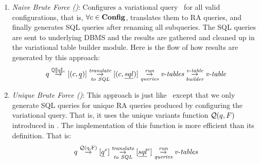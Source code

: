 \begin{enumerate}
\item
\emph{Naive Brute Force (\nbf)}:
Configures a variational query \vQ\ for all valid configurations, that is, 
\ensuremath{\forall \config \in \confSet}, translates them to RA queries,
and finally generates SQL queries after renaming all subqueries. The 
SQL queries are sent to underlying DBMS and the results are gathered and
cleaned up in the variational table builder module. Here is the flow of how results are generated by 
this approach:
%
\[\vQ \mathrel{\mathop{\rightarrow}^{\mathrm{\eeSem \vQ}}} [ ( \config, \pQ ) ] 
\mathrel{\mathop{\rightarrow}^{\mathrm{\textit{translate}}}_{\mathrm{\textit{to SQL}}}} [ ( \config, \sqlQ ) ]
\mathrel{\mathop{\rightarrow}^{\mathrm{\textit{run}}}_{\mathrm{\textit{queries}}}} \textit{v-tables}
\mathrel{\mathop{\rightarrow}^{\mathrm{\textit{v-table}}}_{\mathrm{\textit{builder}}}} \textit{v-table}
\]
%
%
\item
\emph{Unique Brute Force (\ubf)}:
This approach is just like \nbf\ except that we only generate SQL 
queries for unique RA queries produced by  configuring the variational query.
That is, it uses the unique variants function \ensuremath{\qGroup \vQ} introduced
in .
The implementation of this function is more efficient than its definition.
That is:
%
\[\vQ \mathrel{\mathop{\rightarrow}^{\mathrm{\qGroup \vQ}}} [ \annot [\dimMeta] {\pQ} ] 
\mathrel{\mathop{\rightarrow}^{\mathrm{\textit{translate}}}_{\mathrm{\textit{to SQL}}}} [ \annot [\dimMeta] {\sqlQ} ]
\mathrel{\mathop{\rightarrow}^{\mathrm{\textit{run}}}_{\mathrm{\textit{queries}}}} \textit{v-tables}
\]
\end{enumerate}

